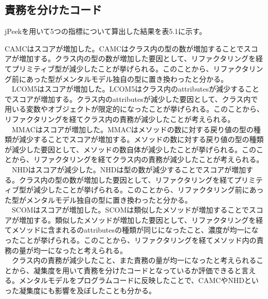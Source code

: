 \documentclass[12pt, a4paper]{jreport}
\begin{document}
\subsection{責務を分けたコード}
jPeekを用いて5つの指標について算出した結果を表5.1に示す。
\begin{table}[H]
\centering
\caption{jPeekによる算出結果}
\label{ttt}
\end{table}
CAMCはスコアが増加した。CAMCはクラス内の型の数が増加することでスコアが増加する。クラス内の型の数が増加した要因として、リファクタリングを経てプリミティブ型が減少したことが挙げられる。このことから、リファクタリング前にあった型がメンタルモデル独自の型に置き換わったと分かる。
\\　LCOM5はスコアが増加した。LCOM5はクラス内のattributesが減少することでスコアが増加する。クラス内のattributesが減少した要因として、クラス内で用いる変数やオブジェクトが限定的になったことが挙げられる。このことから、リファクタリングを経てクラス内の責務が減少したことが考えられる。
\\　MMACはスコアが増加した。MMACはメソッドの数に対する戻り値の型の種類が減少することでスコアが増加する。メソッドの数に対する戻り値の型の種類が減少した要因として、メソッドの数自体が減少したことが挙げられる。このことから、リファクタリングを経てクラス内の責務が減少したことが考えられる。
\\　NHDはスコアが減少した。NHDは型の数が減少することでスコアが増加する。クラス内の型の数が増加した要因として、リファクタリングを経てプリミティブ型が減少したことが挙げられる。このことから、リファクタリング前にあった型がメンタルモデル独自の型に置き換わったと分かる。
\\　SCOMはスコアが増加した。SCOMは類似したメソッドが増加することでスコアが増加する。類似したメソッドが増加した要因として、リファクタリングを経てメソッドに含まれるのattributesの種類が同じになったこと、濃度が均一になったことが挙げられる。このことから、リファクタリングを経てメソッド内の責務の量が均一になったと考えられる。
\\　クラス内の責務が減少したこと、また責務の量が均一になったと考えられることから、凝集度を用いて責務を分けたコードとなっているか評価できると言える。メンタルモデルをプログラムコードに反映したことで、CAMCやNHDといった凝集度にも影響を及ぼしたことも分かる。
\end{document}
